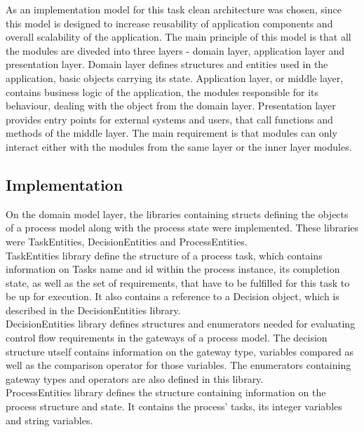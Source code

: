 As an implementation model for this task clean architecture was chosen, since this model is designed to increase reusability of application components and overall scalability of the application. The main principle of this model is that all the modules are diveded into three layers - domain layer, application layer and presentation layer. Domain layer defines structures and entities used in the application, basic objects carrying its state. Application layer, or middle layer, contains business logic of the application, the modules responsible for its behaviour, dealing with the object from the domain layer. Presentation layer provides entry points for external systems and users, that call functions and methods of the middle layer. The main requirement is that modules can only interact either with the modules from the same layer or the inner layer modules.

\subsection{Implementation}
\label{sec:impr:eth:implementation}

On the domain model layer, the libraries containing structs defining the objects of a process model along with the process state were implemented. These libraries were TaskEntities, DecisionEntities and ProcessEntities.\\

TaskEntities library define the structure of a process task, which contains information on Tasks name and id within the process instance, its completion state, as well as the set of requirements, that have to be fulfilled for this task to be up for execution. It also contains a reference to a Decision object, which is described in the DecisionEntities library.\\

DecisionEntities library defines structures and enumerators needed for evaluating control flow requirements in the gateways of a process model. The decision structure utself contains information on the gateway type, variables compared as well as the comparison operator for those variables. The enumerators containing gateway types and operators are also defined in this library.\\

ProcessEntities library defines the structure containing information on the process structure and state. It contains the process' tasks, its integer variables and string variables.\\

